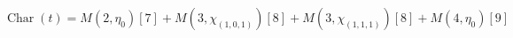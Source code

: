 \[
\operatorname{Char}(t)=M(2,\eta_{0})[7] + M(3,\chi_{(1,0,1)})[8] + M(3,\chi_{(1,1,1)})[8] + M(4,\eta_{0})[9]
\]
